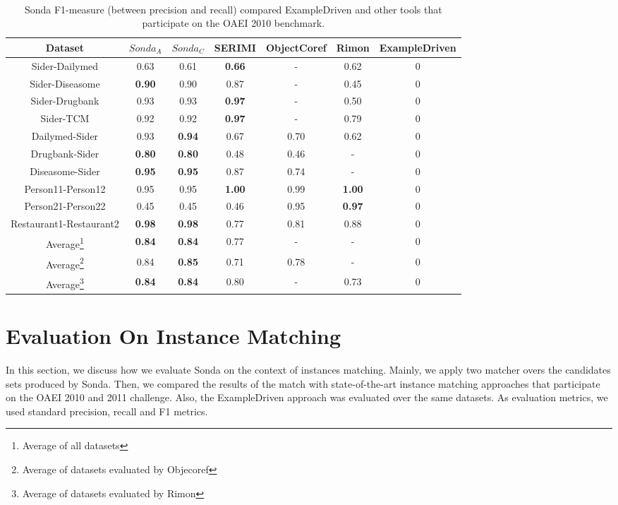 \begin{center}
\begin{table}[h]
\centering
\scriptsize\tt
\caption{Sonda  F1-measure (between precision and recall) compared ExampleDriven and  other tools that participate on the OAEI 2010 benchmark.} 
\begin{tabular}{|c|c|c|c|c|c|c|}
\hline
Dataset &  $Sonda_A$ & $Sonda_C$& SERIMI & ObjectCoref & Rimon & ExampleDriven \\ \hline
Sider-Dailymed & 0.63 & 0.61   & \textbf{0.66} & - & 0.62  & 0\\ \hline
Sider-Diseasome & \textbf{0.90} & 0.90   & 0.87 & - & 0.45 & 0\\ \hline
Sider-Drugbank & 0.93 & 0.93  & \textbf{0.97} & - & 0.50  & 0\\ \hline
Sider-TCM & 0.92 & 0.92  & \textbf{0.97} & - & 0.79 &  0\\ \hline
Dailymed-Sider & 0.93  &\textbf{0.94} & 0.67 & 0.70 & 0.62  & 0\\ \hline
Drugbank-Sider & \textbf{0.80}  & \textbf{0.80} & 0.48 & 0.46 & -  & 0\\ \hline
Diseasome-Sider & \textbf{0.95} & \textbf{0.95}  & 0.87 & 0.74 & -  & 0\\ \hline
Person11-Person12 & 0.95 & 0.95  & \textbf{1.00} & 0.99 & \textbf{1.00}  & 0\\ \hline
Person21-Person22 & 0.45 & 0.45  & 0.46 & 0.95 & \textbf{0.97} & 0\\ \hline
Restaurant1-Restaurant2 & \textbf{0.98} & \textbf{0.98}  & 0.77 & 0.81  & 0.88 & 0\\ \hline
Average\footnote{Average of all datasets} &  		\textbf{0.84}	& \textbf{0.84}	& 0.77 & - & - &0						 	\\ \hline								 
Average\footnote{Average of datasets evaluated by Objecoref} &  	0.84 &	\textbf{0.85}	&0.71&	0.78&-&0\\ \hline
Average\footnote{Average of datasets evaluated by Rimon} &\textbf{0.84}	&\textbf{0.84}	&0.80	&	-&0.73 & 0\\ \hline
\end{tabular}  
\end{table} 
\end{center}



\section{Evaluation On Instance Matching}
In this section, we discuss how we evaluate Sonda on the context of instances matching.  Mainly, we apply two matcher overs the candidates sets produced by Sonda. Then, we compared the results of the match with state-of-the-art instance matching approaches that participate on the OAEI 2010 and 2011 challenge. Also, the ExampleDriven approach was evaluated over the same datasets. As evaluation metrics, we used standard precision, recall and F1 metrics. 


